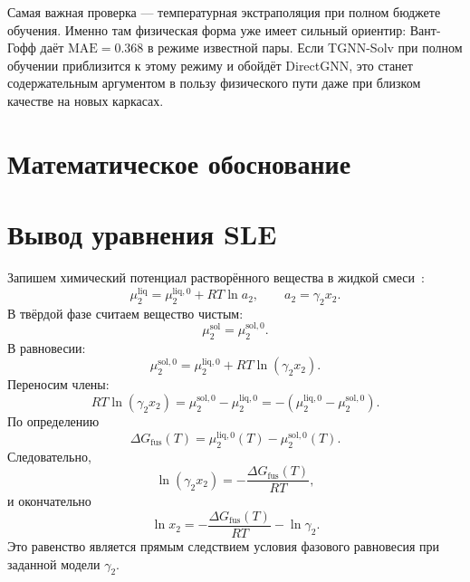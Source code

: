 \documentclass[11pt]{article}
\newcommand{\mae}{\mathrm{MAE}}
\newcommand{\dGfus}{\Delta G_{\mathrm{fus}}}
\theoremstyle{definition}
\begin{document}
Самая важная проверка --- температурная экстраполяция при полном бюджете обучения. Именно там физическая форма уже имеет сильный ориентир: Вант-Гофф даёт $\mae=0.368$ в режиме известной пары. Если TGNN-Solv при полном обучении приблизится к этому режиму и обойдёт DirectGNN, это станет содержательным аргументом в пользу физического пути даже при близком качестве на новых каркасах.

\clearpage

\section*{Математическое обоснование}

\section{Вывод уравнения SLE}
\label{app:sle}

Запишем химический потенциал растворённого вещества в жидкой смеси~\cite{prausnitz1998,hildebrand1970}:
\begin{equation*}
    \mu_2^{\mathrm{liq}} = \mu_2^{\mathrm{liq},0} + RT\ln a_2,
    \qquad
    a_2=\gamma_2 x_2.
\end{equation*}
В твёрдой фазе считаем вещество чистым:
\begin{equation*}
    \mu_2^{\mathrm{sol}}=\mu_2^{\mathrm{sol},0}.
\end{equation*}
В равновесии:
\begin{equation*}
    \mu_2^{\mathrm{sol},0}=\mu_2^{\mathrm{liq},0}+RT\ln(\gamma_2x_2).
\end{equation*}
Переносим члены:
\begin{equation*}
    RT\ln(\gamma_2x_2)=\mu_2^{\mathrm{sol},0}-\mu_2^{\mathrm{liq},0}
    =-\left(\mu_2^{\mathrm{liq},0}-\mu_2^{\mathrm{sol},0}\right).
\end{equation*}
По определению
\begin{equation*}
    \dGfus(T)=\mu_2^{\mathrm{liq},0}(T)-\mu_2^{\mathrm{sol},0}(T).
\end{equation*}
Следовательно,
\begin{equation*}
    \ln(\gamma_2x_2)=-\frac{\dGfus(T)}{RT},
\end{equation*}
и окончательно
\begin{equation*}
    \ln x_2=-\frac{\dGfus(T)}{RT}-\ln\gamma_2.
\end{equation*}
Это равенство является прямым следствием условия фазового равновесия при заданной модели $\gamma_2$.
\end{document}
